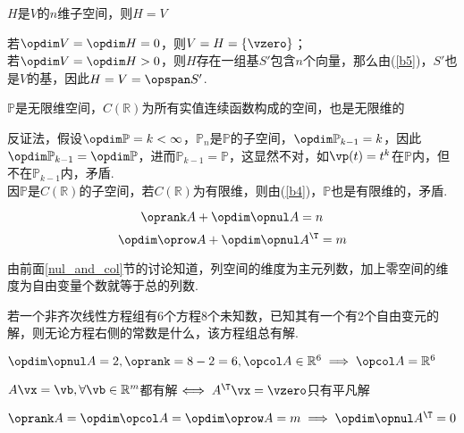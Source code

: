 \begin{theorem}
\begin{partlist}
\begin{analysis}
	\end{analysis}
	\item $H$是$V$的$n$维子空间，则$H=V$
	\begin{analysis}
	若$\opdim V=\opdim H=0$，则$V=H=\{\vzero\}$；\\
	若$\opdim V=\opdim H>0$，则$H$存在一组基$S'$包含$n$个向量，那么由(\ref{b5})，$S'$也是$V$的基，因此$H=V=\opspan S'$.
	\end{analysis}
	\item $\mathbb{P}$是无限维空间，$C(\mathbb{R})$为所有实值连续函数构成的空间，也是无限维的
	\begin{analysis}
	反证法，假设$\opdim\mathbb{P}=k<\infty$，$\mathbb{P}_n$是$\mathbb{P}$的子空间，$\opdim\mathbb{P}_{k-1}=k$，因此$\opdim\mathbb{P}_{k-1}=\opdim\mathbb{P}$，进而$\mathbb{P}_{k-1}=\mathbb{P}$，这显然不对，如$\vp(t)=t^k$在$\mathbb{P}$内，但不在$\mathbb{P}_{k-1}$内，矛盾.\\
	因$\mathbb{P}$是$C(\mathbb{R})$的子空间，若$C(\mathbb{R})$为有限维，则由(\ref{b4})，$\mathbb{P}$也是有限维的，矛盾.
	\end{analysis}
\end{partlist}
\end{theorem}
\begin{theorem}[秩定理]
\label{rank_theo}
\[\oprank A+\opdim\opnul A=n\]
\[\opdim\oprow A+\opdim \opnul A^\T =m\]
\end{theorem}
\begin{analysis}
由前面\ref{nul_and_col}节的讨论知道，列空间的维度为主元列数，加上零空间的维度为自由变量个数就等于总的列数.
\end{analysis}
\begin{example}
若一个非齐次线性方程组有$6$个方程$8$个未知数，已知其有一个有$2$个自由变元的解，则无论方程右侧的常数是什么，该方程组总有解.
\end{example}
\begin{analysis}
$\opdim\opnul A=2,\oprank=8-2=6,\opcol A\in\mathbb{R}^6\implies\opcol A=\mathbb{R}^6$
\end{analysis}
\begin{example}
$A\vx=\vb,\forall\vb\in\mathbb{R}^m$都有解$\iff A^\T \vx=\vzero$只有平凡解
\end{example}
\begin{analysis}
$\oprank A=\opdim\opcol A=\opdim\oprow A=m\implies\opdim\opnul A^\T =0$
\end{analysis}
